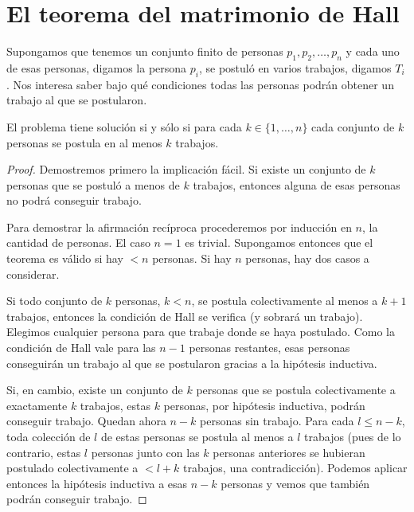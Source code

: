 \chapter{El teorema del matrimonio de Hall}

Supongamos que tenemos un conjunto finito de personas $p_1,p_2,\dots,p_n$ y cada uno de esas 
personas, digamos la persona $p_i$, se postuló en varios trabajos, digamos $T_i$. 
Nos interesa saber bajo qué condiciones todas 
las personas podrán obtener un trabajo al que se postularon. 

\begin{theorem}[Hall]
El problema tiene solución si y sólo si para 
cada $k\in\{1,\dots,n\}$ cada conjunto de $k$ personas 
se postula en al menos $k$ trabajos.
\end{theorem}

\begin{proof}
    Demostremos primero la implicación fácil. Si existe un conjunto de $k$ personas que se postuló a menos de $k$ trabajos, entonces alguna de esas personas 
    no podrá conseguir trabajo. 
    
    Para demostrar la afirmación recíproca procederemos por 
    inducción en $n$, la cantidad de personas. El caso $n=1$ es trivial. Supongamos entonces que el teorema
    es válido si hay $<n$ personas. Si hay $n$ personas, hay dos casos a considerar. 
    
    Si todo conjunto de $k$ personas, $k<n$, se postula colectivamente al menos a $k+1$ trabajos, entonces la condición de Hall se verifica (y sobrará un trabajo). Elegimos
    cualquier persona para que trabaje donde se haya postulado. Como la condición de Hall vale para las $n-1$ personas restantes, esas personas conseguirán un trabajo al que se postularon 
    gracias a la hipótesis inductiva. 
    
    Si, en cambio, existe un conjunto de $k$ personas que se postula colectivamente a exactamente $k$ trabajos, estas $k$ personas, por hipótesis inductiva, podrán conseguir trabajo. 
    Quedan ahora $n-k$ personas sin trabajo. Para cada $l\leq n-k$, toda colección de $l$ de estas personas se postula al menos a $l$ trabajos 
    (pues de lo contrario, estas $l$ personas junto con las $k$ personas anteriores se hubieran postulado colectivamente a $<l+k$ trabajos, una contradicción). Podemos 
    aplicar entonces la hipótesis inductiva a esas $n-k$ personas y vemos que también podrán conseguir trabajo. 
\end{proof}

